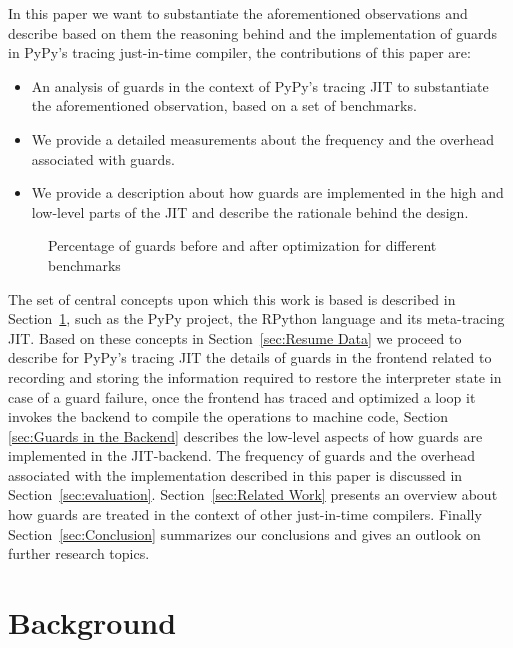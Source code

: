 \documentclass[10pt,preprint]{sigplanconf}
\newcommand\bivab[1]{\nb{DAVID}{#1}}
\begin{document}
In this paper we want to substantiate the aforementioned observations and
describe based on them the reasoning behind and the implementation of guards in
PyPy's tracing just-in-time compiler, the contributions of this paper are:
\begin{itemize}
  \item An analysis of guards in the context of PyPy's tracing JIT to
  substantiate the aforementioned observation, based on a set of benchmarks.
  \item We provide a detailed measurements about the frequency and the
  overhead associated with guards.
  \item We provide a description about how guards are implemented in the high\-
  and low-level parts of the JIT and describe the rationale behind the design.
\end{itemize}
\begin{figure}
    
    \caption{Percentage of guards before and after optimization for different benchmarks}
    \label{fig:guard_percent}
\end{figure}

The set of central concepts upon which this work is based is described in
Section~\ref{sec:Background}, such as the PyPy project, the RPython language
and its meta-tracing JIT. Based on these concepts in Section~\ref{sec:Resume
Data} we proceed to describe for PyPy's tracing JIT the details of guards in
the frontend\bivab{better term for this?} related to recording and storing the
information required to restore the interpreter state in case of a guard
failure, once the frontend has traced and optimized a loop it invokes the
backend to compile the operations to machine code, Section \ref{sec:Guards in
the Backend} describes the low-level aspects of how guards are implemented in
the JIT-backend. The frequency of guards and the overhead associated with the
implementation described in this paper is discussed in
Section~\ref{sec:evaluation}. Section~\ref{sec:Related Work} presents an
overview about how guards are treated in the context of other just-in-time
compilers. Finally Section~\ref{sec:Conclusion} summarizes our conclusions and
gives an outlook on further research topics.


\section{Background}
\label{sec:Background}
\end{document}
